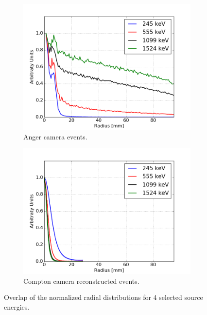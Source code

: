\begin{figure}
\begin{subfigure}{.5\textwidth}
\centering
  \includegraphics[width=.91\linewidth]{03_GraphicFiles/chapter4/SPECT/anger/radial_distribution_overlap}
  \caption{Anger camera events.}
  \label{fig:rad_distr_overlap_CA}
\end{subfigure}
\begin{subfigure}{.5\textwidth}
\centering
  \includegraphics[width=.91\linewidth]{03_GraphicFiles/chapter4/SPECT/compton/radial_distribution_overlap_sel}
  \caption{Compton camera reconstructed events.}
  \label{fig:rad_distr_overlap_CC}
\end{subfigure}
\caption{Overlap of the normalized radial distributions for 4 selected source energies.}
\label{fig:rad_distr_overlap}
\end{figure} 
               
